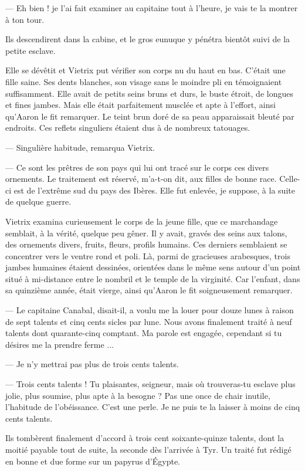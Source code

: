 \documentclass[a4paper, 11pt, oneside, polutonikogreek, french]{article}
\begin{document}
--- Eh bien ! je l'ai fait examiner au capitaine tout à l'heure, je vais te la montrer à ton tour.

Ils descendirent dans la cabine, et le gros eunuque y pénétra bientôt suivi de la petite esclave.

Elle se dévêtit et Vietrix put vérifier son corps nu du haut en bas. C'était une fille saine. Ses dents blanches, son visage sans le moindre pli en témoignaient suffisamment. Elle avait de petits seins bruns et durs, le buste étroit, de longues et fines jambes. Mais elle était parfaitement musclée et apte à l'effort, ainsi qu'Aaron le fit remarquer. Le teint brun doré de sa peau apparaissait bleuté par endroits. Ces reflets singuliers étaient dus à de nombreux tatouages.

--- Singulière habitude, remarqua Vietrix.

--- Ce sont les prêtres de son pays qui lui ont tracé sur le corps ces divers ornements. Le traitement est réservé, m'a-t-on dit, aux filles de bonne race. Celle-ci est de l'extrême sud du pays des Ibères. Elle fut enlevée, je suppose, à la suite de quelque guerre.

Vietrix examina curieusement le corps de la jeune fille, que ce marchandage semblait, à la vérité, quelque peu gêner. Il y avait, gravés des seins aux talons, des ornements divers, fruits, fleurs, profils humains. Ces derniers semblaient se concentrer vers le ventre rond et poli. Là, parmi de gracieuses arabesques, trois jambes humaines étaient dessinées, orientées dans le même sens autour d'un point situé à mi-distance entre le nombril et le temple de la virginité. Car l'enfant, dans sa quinzième année, était vierge, ainsi qu'Aaron le fit soigneusement remarquer.

--- Le capitaine Canabal, disait-il, a voulu me la louer pour douze lunes à raison de sept talents et cinq cents sicles par lune. Nous avons finalement traité à neuf talents dont quarante-cinq comptant. Ma parole est engagée, cependant si tu désires me la prendre ferme ...

--- Je n'y mettrai pas plus de trois cents talents.

--- Trois cents talents ! Tu plaisantes, seigneur, mais où trouveras-tu esclave plus jolie, plus soumise, plus apte à la besogne ? Pas une once de chair inutile, l'habitude de l'obéissance. C'est une perle. Je ne puis te la laisser à moins de cinq cents talents.

Ils tombèrent finalement d'accord à trois cent soixante-quinze talents, dont la moitié payable tout de suite, la seconde dès l'arrivée à Tyr. Un traité fut rédigé en bonne et due forme sur un papyrus d'Égypte.
\end{document}
